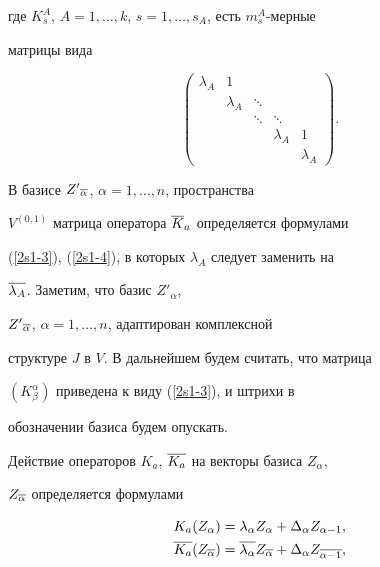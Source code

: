 где $K_s^A$, $A=1,\dotsc,k$, $s=1,\dotsc,s_A$, есть $m_s^A$-мерные


матрицы вида


\begin{equation}


\label{2s1-4}


\begin{pmatrix}


\lambda_A & 1 & & & \\


& \lambda_A & \ddots & & \\


& & \ddots & \ddots & \\


& & & \lambda_A & 1 \\


& & & & \lambda_A


\end{pmatrix}


.


\end{equation}





В базисе ${Z'}_{\overline\alpha}$, $\alpha=1,\dotsc,n$, пространства


$V^{(0,1)}$ матрица оператора $\overline K_a$ определяется формулами


(\ref{2s1-3}), (\ref{2s1-4}), в которых $\lambda_A$ следует заменить на


$\overline{\lambda_A}$. Заметим, что базис ${Z'}_{\alpha}$,


${Z'}_{\overline\alpha}$, $\alpha=1,\dotsc,n$, адаптирован комплексной


структуре $J$ в $V$. В дальнейшем будем считать, что матрица


$(K^\alpha_\beta)$ приведена к виду (\ref{2s1-3}), и штрихи в


обозначении базиса будем опускать.





Действие операторов $K_a$, $\overline{K_a}$ на векторы базиса $Z_{\alpha}$,


$Z_{\overline\alpha}$ определяется формулами


\begin{equation}


\begin{split}


\label{2s1-5}


K_a(Z_\alpha)&=\lambda_\alpha Z_\alpha + \Delta_\alpha Z_{\alpha-1},\\


\ol{K_a}(Z_{\ol\alpha}) &= \ol{\lambda_\alpha}


Z_{\ol\alpha} + \Delta_\alpha Z_{\ol{\alpha-1}},


\end{split}


\end{equation}


